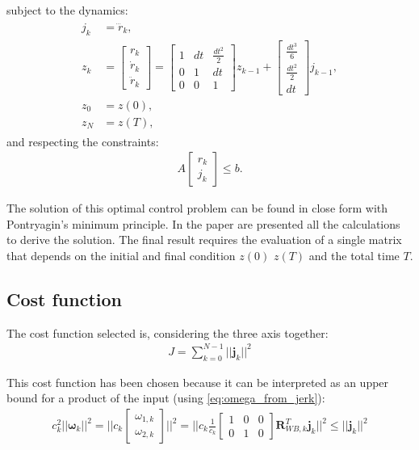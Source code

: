 subject to the dynamics:
\begin{align}
\begin{split}
j_k &= \dddot{r}_k,\\[10pt]
z_k  &= 
{\begin{bmatrix}
 r_k \\[5pt]
 \dot{r}_k \\[5pt]
 \ddot{r}_k
\end{bmatrix}} = 
{\begin{bmatrix}
1 & dt & \frac{dt^2}{2}  \\[5pt]
0 & 1 & dt \\[5pt]
0 & 0 & 1
\end{bmatrix}}z_{k-1} + 
{\begin{bmatrix}
 \frac{dt^3}{6}  \\[5pt]
 \frac{dt^2}{2} \\[5pt]
 dt
\end{bmatrix}}j_{k-1}, \\[10pt]
z_0 &= z(0), \\[5pt]
z_N &= z(T),
\end{split}
\end{align}
and respecting the constraints:
\begin{align}
A
{\begin{bmatrix}
 r_k \\[10pt]
j_k
\end{bmatrix}} \leq b.
\end{align}

The solution of this optimal control problem can be found in close form with Pontryagin's minimum principle.
In the paper \cite{mueller2015computationally} are presented all the calculations to derive the solution. The final result requires the evaluation of a single matrix that depends on the initial and final condition $z(0)$ $z(T)$ and the total time $T$.

\subsection{Cost function}
The cost function selected is, considering the three axis together:
\begin{align}
J = \sum_{k=0}^{N-1} ||\boldsymbol{j}_k||^2
\end{align}

This cost function has been chosen because it can be interpreted as an upper bound for a product of the input (using \eqref{eq:omega_from_jerk}):
\begin{align}
c_k^2||\boldsymbol{\omega}_k||^2 = \Big|\Big| c_k
\begin{bmatrix}
\omega_{1,k} \\[2pt]
\omega_{2,k}
\end{bmatrix}\Big|\Big|^2 = \Big|\Big| c_k \frac{1}{c_k}
{\begin{bmatrix}
1 & 0 & 0  \\[2pt]
0 & 1 & 0
\end{bmatrix}}\boldsymbol{R}_{WB,k}^T \boldsymbol{j}_k\Big|\Big|^2 \leq ||\boldsymbol{j}_k||^2
\end{align}

